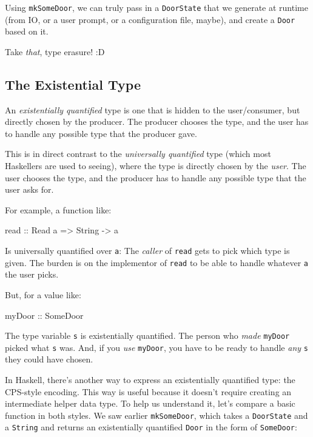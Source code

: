 \documentclass[]{article}
\newenvironment{Shaded}{}{}
\newcommand{\DataTypeTok}[1]{\textcolor[rgb]{0.56,0.13,0.00}{#1}}
\newcommand{\OtherTok}[1]{\textcolor[rgb]{0.00,0.44,0.13}{#1}}
\newcommand{\NormalTok}[1]{#1}
\begin{document}
Using \texttt{mkSomeDoor}, we can truly pass in a \texttt{DoorState} that we
generate at runtime (from IO, or a user prompt, or a configuration file, maybe),
and create a \texttt{Door} based on it.

Take \emph{that}, type erasure! :D

\subsection{The Existential Type}\label{the-existential-type}

An \emph{existentially quantified} type is one that is hidden to the
user/consumer, but directly chosen by the producer. The producer chooses the
type, and the user has to handle any possible type that the producer gave.

This is in direct contrast to the \emph{universally quantified} type (which most
Haskellers are used to seeing), where the type is directly chosen by the
\emph{user}. The user chooses the type, and the producer has to handle any
possible type that the user asks for.

For example, a function like:

\begin{Shaded}
\begin{Highlighting}[]
\NormalTok{read}\OtherTok{ ::} \DataTypeTok{Read}\NormalTok{ a }\OtherTok{=>} \DataTypeTok{String} \OtherTok{->}\NormalTok{ a}
\end{Highlighting}
\end{Shaded}

Is universally quantified over \texttt{a}: The \emph{caller} of \texttt{read}
gets to pick which type is given. The burden is on the implementor of
\texttt{read} to be able to handle whatever \texttt{a} the user picks.

But, for a value like:

\begin{Shaded}
\begin{Highlighting}[]
\OtherTok{myDoor ::} \DataTypeTok{SomeDoor}
\end{Highlighting}
\end{Shaded}

The type variable \texttt{s} is existentially quantified. The person who
\emph{made} \texttt{myDoor} picked what \texttt{s} was. And, if you \emph{use}
\texttt{myDoor}, you have to be ready to handle \emph{any} \texttt{s} they could
have chosen.

In Haskell, there's another way to express an existentially quantified type: the
CPS-style encoding. This way is useful because it doesn't require creating an
intermediate helper data type. To help us understand it, let's compare a basic
function in both styles. We saw earlier \texttt{mkSomeDoor}, which takes a
\texttt{DoorState} and a \texttt{String} and returns an existentially quantified
\texttt{Door} in the form of \texttt{SomeDoor}:
\end{document}
